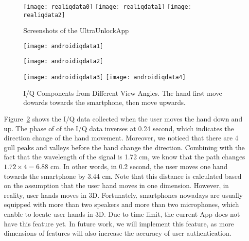 \begin{figure}[h]
	\centering
	\begin{minipage}{.6\linewidth}
		\texttt{[image: realiqdata0]}
		\vspace{.1in}
		\texttt{[image: realiqdata1]}
		\vspace{.1in}
		\texttt{[image: realiqdata2]}
	\end{minipage}
	\caption{Screenshots of the UltraUnlockApp}	
	\label{fig:realIQ}
\end{figure}

\begin{figure}[!h]
	\centering
	\texttt{[image: androidiqdata1]}
	\begin{minipage}{.4\linewidth}
		\texttt{[image: androidiqdata2]}
	\end{minipage}
	\hfil
	\begin{minipage}{.5\linewidth}
		\texttt{[image: androidiqdata3]}
		\texttt{[image: androidiqdata4]}
	\end{minipage}
	\caption[I/Q Components Collected by UltraUnlockApp]{I/Q Components from Different View Angles. The hand first move dowards towards the smartphone, then move upwards.}
	\label{fig:androidiqdata}
\end{figure}

Figure~\ref{fig:androidiqdata} shows the I/Q data collected when the user moves the hand down and up. The phase of of the I/Q data inverses at 0.24 second, which indicates the direction change of the hand movement. Moreover, we noticed that there are 4 gull peaks and valleys before the hand change the direction. Combining with the fact that the wavelength of the signal is 1.72 cm, we know that the path changes $1.72 \times 4 = 6.88$ cm. In other words, in 0.2 second, the user moves one hand towards the smartphone by 3.44 cm. Note that this distance is calculated based on the assumption that the user hand moves in one dimension. However, in reality, user hands moves in 3D. Fortunately, smartphones nowadays are usually equipped with more than two speakers and more than two microphones, which enable {\uu} to locate user hands in 3D. Due to time limit, the current {\uu}App does not have this feature yet. In future work, we will implement this feature, as more dimensions of features will also increase the accuracy of user authentication.

